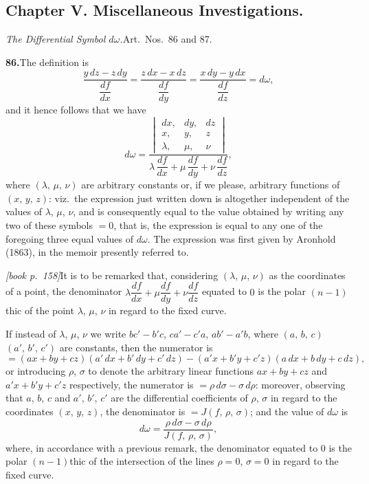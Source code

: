 \documentclass[11pt,a4paper]{article}
\begin{document}
\subsection*{Chapter V. Miscellaneous Investigations.}

\medskip\noindent\textit{The Differential Symbol $d\omega$.}\quad Art.\ Nos.\ 86 and 87.

\medskip\noindent\textbf{86.}\quad The definition is
\[
\frac{y\,dz - z\,dy}{\dfrac{df}{dx}} = \frac{z\,dx - x\,dz}{\dfrac{df}{dy}} = \frac{x\,dy - y\,dx}{\dfrac{df}{dz}} = d\omega,
\]
and it hence follows that we have
\[
d\omega = \frac{\begin{vmatrix} dx, & dy, & dz\\ x, & y, & z\\ \lambda, & \mu, & \nu\end{vmatrix}}{\lambda\,\dfrac{df}{dx} + \mu\,\dfrac{df}{dy} + \nu\,\dfrac{df}{dz}},
\]
where $(\lambda,\,\mu,\,\nu)$ are arbitrary constants or, if we please, arbitrary functions of $(x,\,y,\,z)$: viz.\ the expression just written down is altogether independent of the values of $\lambda$, $\mu$, $\nu$, and is consequently equal to the value obtained by writing any two of these symbols $= 0$, that is, the expression is equal to any one of the foregoing three equal values of $d\omega$. The expression was first given by Aronhold (1863), in the memoir presently referred to.

\medskip\noindent\textit{[book p.~158]}\quad It is to be remarked that, considering $(\lambda,\,\mu,\,\nu)$ as the coordinates of a point, the denominator $\lambda\dfrac{df}{dx} + \mu\dfrac{df}{dy} + \nu\dfrac{df}{dz}$ equated to $0$ is the polar $(n-1)$thic of the point $\lambda$, $\mu$, $\nu$ in regard to the fixed curve.

If instead of $\lambda$, $\mu$, $\nu$ we write $bc' - b'c$, $ca' - c'a$, $ab' - a'b$, where $(a,\,b,\,c)$ $(a',\,b',\,c')$ are constants, then the numerator is
\[
= (ax + by + cz)(a'\,dx + b'\,dy + c'\,dz) - (a'x + b'y + c'z)(a\,dx + b\,dy + c\,dz),
\]
or introducing $\rho$, $\sigma$ to denote the arbitrary linear functions $ax + by + cz$ and $a'x + b'y + c'z$ respectively, the numerator is $= \rho\,d\sigma - \sigma\,d\rho$: moreover, observing that $a$, $b$, $c$ and $a'$, $b'$, $c'$ are the differential coefficients of $\rho$, $\sigma$ in regard to the coordinates $(x,\,y,\,z)$, the denominator is $= J(f,\,\rho,\,\sigma)$; and the value of $d\omega$ is
\[
d\omega = \frac{\rho\,d\sigma - \sigma\,d\rho}{J(f,\,\rho,\,\sigma)},
\]
where, in accordance with a previous remark, the denominator equated to $0$ is the polar $(n-1)$thic of the intersection of the lines $\rho = 0$, $\sigma = 0$ in regard to the fixed curve.
\end{document}
